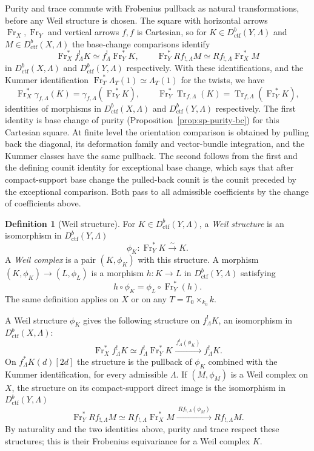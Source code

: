 \documentclass[11pt,a4paper]{article}
\numberwithin{equation}{section}
\theoremstyle{definition}
\newtheorem{definition}[theorem]{Definition}
\theoremstyle{remark}
\newcommand{\Dctf}{D^b_{\mathrm{ctf}}}
\begin{document}
Purity and trace commute with Frobenius pullback as natural
transformations, before any Weil structure is chosen. The square with
horizontal arrows $\operatorname{Fr}_X,\operatorname{Fr}_Y$ and vertical
arrows $f,f$ is Cartesian, so for $K\in\Dctf(Y,\Lambda)$ and
$M\in\Dctf(X,\Lambda)$ the base-change comparisons identify
\[
 \operatorname{Fr}_X^*f_\Lambda^!K
       \simeq f_\Lambda^!\operatorname{Fr}_Y^*K,
 \qquad
 \operatorname{Fr}_Y^*Rf_{!,\Lambda}M
       \simeq Rf_{!,\Lambda}\operatorname{Fr}_X^*M
\]
in $\Dctf(X,\Lambda)$ and $\Dctf(Y,\Lambda)$ respectively. With these identifications, and the Kummer identification
$\operatorname{Fr}_T^*\Lambda_T(1)\simeq\Lambda_T(1)$ for the twists,
we have
\[
 \operatorname{Fr}_X^*\gamma_{f,\Lambda}(K)
       =\gamma_{f,\Lambda}(\operatorname{Fr}_Y^*K),
 \qquad
 \operatorname{Fr}_Y^*\operatorname{Tr}_{f,\Lambda}(K)
       =\operatorname{Tr}_{f,\Lambda}(\operatorname{Fr}_Y^*K),
\]
identities of morphisms in $\Dctf(X,\Lambda)$ and $\Dctf(Y,\Lambda)$
respectively. The first identity is base change of purity
(Proposition~\ref{prop:sp-purity-bc}) for this Cartesian square. At
finite level the orientation comparison is obtained by pulling back
the diagonal, its deformation family and vector-bundle integration,
and the Kummer classes have the same pullback. The second follows from
the first and the defining counit identity for exceptional base change,
which says that after compact-support base change the pulled-back
counit is the counit preceded by the exceptional comparison. Both pass
to all admissible coefficients by the change of coefficients above.

\begin{definition}[Weil structure]\label{def:sp-Weil-structure}
For $K\in\Dctf(Y,\Lambda)$, a \emph{Weil structure}
is an isomorphism in $\Dctf(Y,\Lambda)$
\[
 \phi_K:\operatorname{Fr}_Y^*K\xrightarrow{\sim}K.
\]
A \emph{Weil complex} is a pair $(K,\phi_K)$ with this structure.
A morphism $(K,\phi_K)\to(L,\phi_L)$ is a morphism
$h:K\to L$ in $\Dctf(Y,\Lambda)$ satisfying
\[
 h\circ\phi_K=\phi_L\circ\operatorname{Fr}_Y^*(h).
\]
The same definition applies on $X$ or on any $T=T_0\times_{k_0}k$.
\end{definition}

A Weil structure $\phi_K$ gives the following structure on
$f_\Lambda^!K$, an isomorphism in $\Dctf(X,\Lambda)$:
\[
 \operatorname{Fr}_X^*f_\Lambda^!K
   \simeq f_\Lambda^!\operatorname{Fr}_Y^*K
   \xrightarrow{\ f_\Lambda^!(\phi_K)\ }f_\Lambda^!K.
\]
On $f_\Lambda^*K(d)[2d]$ the structure is the pullback of $\phi_K$
combined with the Kummer identification, for every admissible
$\Lambda$. If
$(M,\phi_M)$ is a Weil complex on $X$, the structure on its
compact-support direct image is the isomorphism in $\Dctf(Y,\Lambda)$
\[
 \operatorname{Fr}_Y^*Rf_{!,\Lambda}M
   \simeq Rf_{!,\Lambda}\operatorname{Fr}_X^*M
   \xrightarrow{\ Rf_{!,\Lambda}(\phi_M)\ }Rf_{!,\Lambda}M.
\]
By naturality and the two identities above, purity and trace respect
these structures; this is their Frobenius equivariance for a Weil
complex $K$.
\end{document}

